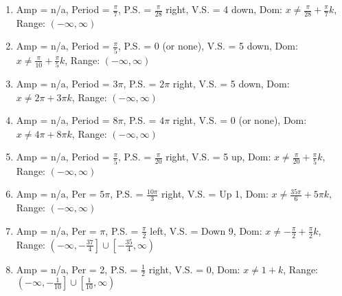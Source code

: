 \begin{enumerate}
	\item Amp = n/a, Period = $\frac{\pi}{7}$, P.S. = $\frac{\pi}{28}$ right, V.S. = 4 down, Dom: $x \neq \frac{\pi}{28} + \frac{\pi}{7}k$, Range: $(-\infty, \infty)$
	\item Amp = n/a, Period = $\frac{\pi}{5}$, P.S. = 0 (or none), V.S. = 5 down, Dom: $x \neq \frac{\pi}{10} + \frac{\pi}{5}k$, Range: $(-\infty, \infty)$
	\item Amp = n/a, Period = $3\pi$, P.S. = $2\pi$ right, V.S. = 5 down, Dom: $x \neq 2\pi + 3\pi k$, Range: $(-\infty, \infty)$
	\item Amp = n/a, Period = $8\pi$, P.S. = $4\pi$ right, V.S. = 0 (or none), Dom: $x \neq 4\pi + 8\pi k$, Range: $(-\infty, \infty)$
	\item Amp = n/a, Period = $\frac{\pi}{5}$, P.S. = $\frac{\pi}{20}$ right, V.S. = 5 up, Dom: $x \neq \frac{\pi}{20} + \frac{\pi}{5}k$, Range: $(-\infty, \infty)$
	\item Amp = n/a, Per = $5\pi$, P.S. = $\frac{10\pi}{3}$ right, V.S. = Up 1, Dom: $x \neq \frac{35\pi}{6} + 5\pi k$, Range: $(-\infty, \infty)$
    \item Amp = n/a, Per = $\pi$, P.S. = $\frac{\pi}{2}$ left, V.S. = Down 9, Dom: $x \neq -\frac{\pi}{2} + \frac{\pi}{2}k$, Range: $\left(-\infty, -\frac{37}{4}\right] \cup \left[-\frac{35}{4}, \infty\right)$
    \item Amp = n/a, Per = 2, P.S. = $\frac{1}{2}$ right, V.S. = 0, Dom: $x \neq 1 + k$, Range: $\left(-\infty, -\frac{1}{10}\right] \cup \left[\frac{1}{10}, \infty\right)$
\end{enumerate}